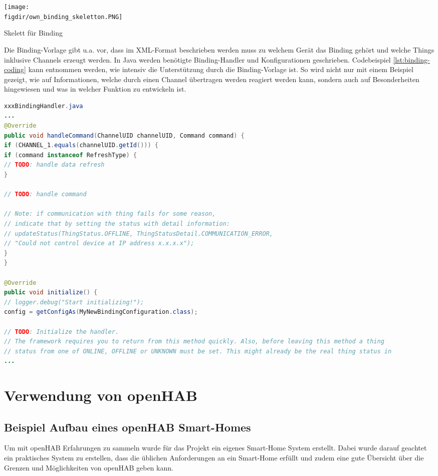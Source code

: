 {
	\centering
	\captionsetup{type=figure}
	\texttt{[image: \\figdir/own\_binding\_skeletton.PNG]}
	\caption{Skelett für Binding \label{fig:own_binding_skeleton}}
}

Die Binding-Vorlage gibt u.a. vor, dass im XML-Format beschrieben werden muss zu welchem Gerät das Binding gehört und welche Things inklusive Channels erzeugt werden. In Java werden benötigte Binding-Handler und Konfigurationen geschrieben. Codebeispiel \ref{lst:binding-coding} kann entnommen werden, wie intensiv die Unterstützung durch die Binding-Vorlage ist. So wird nicht nur mit einem Beispiel gezeigt, wie auf Informationen, welche durch einen Channel übertragen werden reagiert werden kann, sondern auch auf Besonderheiten hingewiesen und was in welcher Funktion zu entwickeln ist.


\begin{lstlisting}[language=java,firstnumber=1,caption=Handler.java Ausschnitt,label=lst:binding-coding]
xxxBindingHandler.java
...
@Override
public void handleCommand(ChannelUID channelUID, Command command) {
if (CHANNEL_1.equals(channelUID.getId())) {
if (command instanceof RefreshType) {
// TODO: handle data refresh
}

// TODO: handle command

// Note: if communication with thing fails for some reason,
// indicate that by setting the status with detail information:
// updateStatus(ThingStatus.OFFLINE, ThingStatusDetail.COMMUNICATION_ERROR,
// "Could not control device at IP address x.x.x.x");
}
}

@Override
public void initialize() {
// logger.debug("Start initializing!");
config = getConfigAs(MyNewBindingConfiguration.class);

// TODO: Initialize the handler.
// The framework requires you to return from this method quickly. Also, before leaving this method a thing
// status from one of ONLINE, OFFLINE or UNKNOWN must be set. This might already be the real thing status in
...
\end{lstlisting}


\section{Verwendung von openHAB}
\label{s:usage-open-hab}


\subsection{Beispiel Aufbau eines openHAB Smart-Homes}
	Um mit openHAB Erfahrungen zu sammeln wurde für das Projekt ein eigenes Smart-Home System erstellt. Dabei wurde darauf geachtet ein praktisches System zu erstellen, dass die üblichen Anforderungen an ein Smart-Home erfüllt und zudem eine gute Übersicht über die Grenzen und Möglichkeiten von openHAB geben kann.


